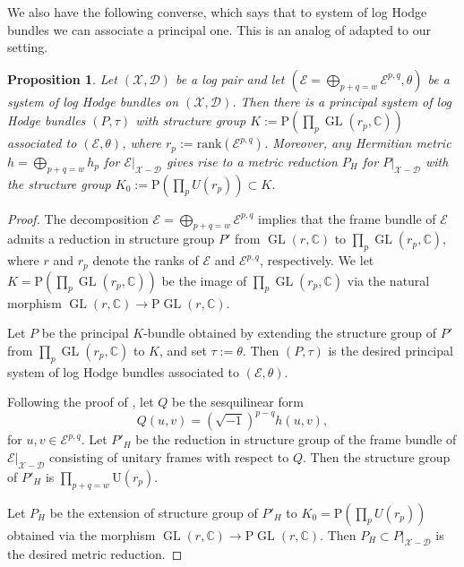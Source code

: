\documentclass[a4paper]{amsart}
\newtheorem{proposition}[theorem]{Proposition}
\theoremstyle{definition}
\def\gl{\mathop{\mathrm{GL}}\nolimits}
\begin{document}
We also have the following converse, which says that to system of log Hodge bundles we can associate a principal one. This is an analog of \cite[Proposition 3.11]{dengcadorel} adapted to our setting.

\begin{proposition}\label{Sys-of-Hodge-bundles-lem}
Let $(\mathscr{X},\mathscr{D})$ be a log pair and let $(\mathcal{E}=\bigoplus_{p+q=w}\mathcal{E}^{p,q},\theta)$ be a system of log Hodge bundles on $(\mathscr{X},\mathscr{D})$. Then there is a principal system of log Hodge bundles $(P,\tau)$ with structure group $K:=\mathrm{P}(\prod_p\gl(r_p,\mathbb{C}))$ associated to $(\mathcal{E},\theta)$, where $r_p:=\mathrm{rank}(\mathcal{E}^{p,q})$. Moreover, any Hermitian metric $h=\bigoplus_{p+q=w}h_p$ for $\mathcal{E}|_{\mathscr{X}-\mathscr{D}}$ gives rise to a metric reduction $P_H$ for $P|_{\mathscr{X}-\mathscr{D}}$ with the structure group $K_0:=\mathrm{P}(\prod_pU(r_p))\subset K$. 
\end{proposition}

\begin{proof}
The decomposition $\mathcal{E}=\bigoplus_{p+q=w}\mathcal{E}^{p,q}$ implies that the frame bundle of $\mathcal{E}$ admits a reduction in structure group $P'$ from $\gl(r,\mathbb{C})$ to $\prod_p\gl(r_p,\mathbb{C})$, where $r$ and $r_p$ denote the ranks of $\mathcal{E}$ and $\mathcal{E}^{p,q}$, respectively. We let $K=\mathrm{P}(\prod_p\gl(r_p,\mathbb{C}))$ be the image of $\prod_p\gl(r_p,\mathbb{C})$ via the natural morphism $\gl(r,\mathbb{C})\to\mathrm{P}\gl(r,\mathbb{C})$.  

Let $P$ be the principal $K$-bundle obtained by extending the structure group of $P'$ from $\prod_p\gl(r_p,\mathbb{C})$ to $K$, and set $\tau:=\theta$. Then $(P,\tau)$ is the desired principal system of log Hodge bundles associated to $(\mathcal{E},\theta)$.

Following the proof of \cite[Proposition 3.11]{dengcadorel}, let $Q$ be the sesquilinear form 
\[
Q(u,v)=(\sqrt{-1})^{p-q}h(u,v), 
\]
for $u,v\in\mathcal{E}^{p,q}$. Let $P'_H$ be the reduction in structure group of the frame bundle of $\mathcal{E}|_{\mathscr{X}-\mathscr{D}}$ consisting of unitary frames with respect to $Q$. Then the structure group of $P'_H$ is $\prod_{p+q=w}\mathrm{U}(r_p)$. 

Let $P_H$ be the extension of structure group of $P'_H$ to $K_0=\mathrm{P}(\prod_pU(r_p))$ obtained via the morphism $\gl(r,\mathbb{C})\to\mathrm{P}\gl(r,\mathbb{C})$. Then $P_H\subset P|_{\mathscr{X}-\mathscr{D}}$ is the desired metric reduction. 
\end{proof}
\end{document}
